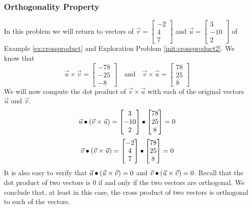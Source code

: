 \documentclass{ximera}
\begin{document}
\subsubsection*{Orthogonality Property}
\begin{exploration}\label{init:orthofcorssproduct}
In this problem we will return to vectors of $\vec{v}=\begin{bmatrix}-2\\ 4\\ 7\end{bmatrix}$ and $\vec{u}=\begin{bmatrix}3\\ -10\\ 2\end{bmatrix}$ of Example \ref{ex:crossproduct} and Exploration Problem \ref{init:crossproduct2}.  We know that
$$\vec{u}\times\vec{v}=\begin{bmatrix}-78\\-25\\-8\end{bmatrix}\quad\text{and}\quad\vec{v}\times\vec{u}=\begin{bmatrix}78\\25\\8\end{bmatrix}$$
We will now compute the dot product of $\vec{v}\times\vec{u}$ with each of the original vectors $\vec{u}$ and $\vec{v}$.
$$\vec{u}\bullet(\vec{v}\times\vec{u})=\begin{bmatrix}3\\ -10\\ 2\end{bmatrix}\bullet\begin{bmatrix}78\\25\\8\end{bmatrix}=0$$
$$\vec{v}\bullet(\vec{v}\times\vec{u})=\begin{bmatrix}-2\\ 4\\ 7\end{bmatrix}\bullet\begin{bmatrix}78\\25\\8\end{bmatrix}=0$$
It is also easy to verify that $\vec{u}\bullet(\vec{u}\times\vec{v})=0$ and $\vec{v}\bullet(\vec{u}\times\vec{v})=0$.  Recall that the dot product of two vectors is $0$ if and only if the two vectors are orthogonal.
We conclude that, at least in this case, the cross product of two vectors is orthogonal to each of the vectors. 
 
\end{exploration}
 
\end{document}
